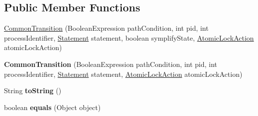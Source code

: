 \subsection*{Public Member Functions}
\begin{DoxyCompactItemize}
\item 
\hyperlink{classedu_1_1udel_1_1cis_1_1vsl_1_1civl_1_1semantics_1_1common_1_1CommonTransition_a8fdd9eab98cbd5069668417ea09b906b}{Common\+Transition} (Boolean\+Expression path\+Condition, int pid, int process\+Identifier, \hyperlink{interfaceedu_1_1udel_1_1cis_1_1vsl_1_1civl_1_1model_1_1IF_1_1statement_1_1Statement}{Statement} statement, boolean symplify\+State, \hyperlink{enumedu_1_1udel_1_1cis_1_1vsl_1_1civl_1_1semantics_1_1IF_1_1Transition_1_1AtomicLockAction}{Atomic\+Lock\+Action} atomic\+Lock\+Action)
\item 
\hypertarget{classedu_1_1udel_1_1cis_1_1vsl_1_1civl_1_1semantics_1_1common_1_1CommonTransition_a0d5aecb0be20d63219c9d5e7d8c6b90c}{}{\bfseries Common\+Transition} (Boolean\+Expression path\+Condition, int pid, int process\+Identifier, \hyperlink{interfaceedu_1_1udel_1_1cis_1_1vsl_1_1civl_1_1model_1_1IF_1_1statement_1_1Statement}{Statement} statement, \hyperlink{enumedu_1_1udel_1_1cis_1_1vsl_1_1civl_1_1semantics_1_1IF_1_1Transition_1_1AtomicLockAction}{Atomic\+Lock\+Action} atomic\+Lock\+Action)\label{classedu_1_1udel_1_1cis_1_1vsl_1_1civl_1_1semantics_1_1common_1_1CommonTransition_a0d5aecb0be20d63219c9d5e7d8c6b90c}

\item 
\hypertarget{classedu_1_1udel_1_1cis_1_1vsl_1_1civl_1_1semantics_1_1common_1_1CommonTransition_a10d56cd725f845bcbe4439654ae266e5}{}String {\bfseries to\+String} ()\label{classedu_1_1udel_1_1cis_1_1vsl_1_1civl_1_1semantics_1_1common_1_1CommonTransition_a10d56cd725f845bcbe4439654ae266e5}

\item 
\hypertarget{classedu_1_1udel_1_1cis_1_1vsl_1_1civl_1_1semantics_1_1common_1_1CommonTransition_a95e86ed38736cd64a13df961594f0ff9}{}boolean {\bfseries equals} (Object object)\label{classedu_1_1udel_1_1cis_1_1vsl_1_1civl_1_1semantics_1_1common_1_1CommonTransition_a95e86ed38736cd64a13df961594f0ff9}


\end{DoxyCompactItemize}

